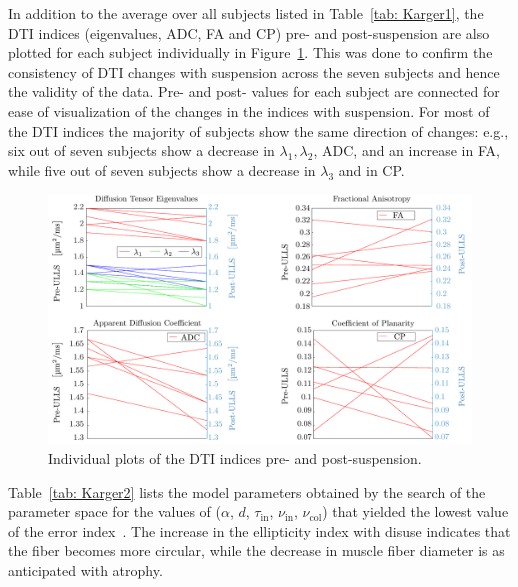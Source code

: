 In addition to the average over all subjects listed in Table~\ref{tab: Karger1}, the DTI indices (eigenvalues, ADC, FA and CP) pre- and post-suspension are also plotted for each subject individually in Figure~\ref{fig: KargerPlots}. 
This was done to confirm the consistency of DTI changes with suspension across the seven subjects and hence the validity of the data.
Pre- and post- values for each subject are connected for ease of visualization of the changes in the indices with suspension. 
For most of the DTI indices the majority of subjects show the same direction of changes: e.g., six out of seven subjects show a decrease in $\lambda_1, \lambda_2$, ADC, and an increase in FA, while five out of seven subjects show a decrease in $\lambda_3$ and in CP.
\begin{figure}[!htb]
\vspace{+0.2cm}
\centering
\includegraphics[width=\textwidth]{Figures/KargerPlots.pdf}
\caption[Individual plots of the DTI indices pre- and post-suspension]{Individual plots of the DTI indices pre- and post-suspension.}
\label{fig: KargerPlots}
\end{figure}
Table~\ref{tab: Karger2} lists the model parameters obtained by the search of the parameter space for the values of ($\alpha$, $d$, $\tau_{\mathrm{in}}$, $\nu_{\mathrm{in}}$, $\nu_{\mathrm{col}}$) that yielded the lowest value of the error index~\cite{RND12}. 
The increase in the ellipticity index with disuse indicates that the fiber becomes more circular, while the decrease in muscle fiber diameter is as anticipated with atrophy. 
